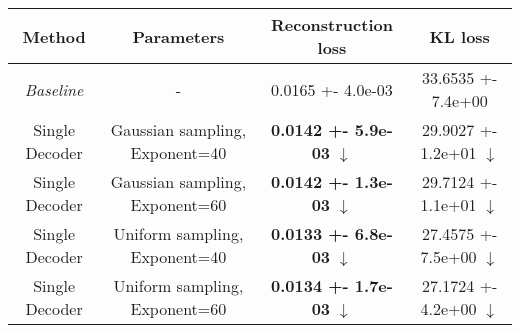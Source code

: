 \centering
\scriptsize
\begin{tabular}{||c|c|c|c||}
\hline
 Method & Parameters & Reconstruction loss & KL loss \\
\hline
\textit{Baseline} & - & 0.0165 +- 4.0e-03 & 33.6535 +- 7.4e+00 \\
\hline
Single Decoder & Gaussian sampling, Exponent=40 & \textbf{0.0142 +- 5.9e-03}  $\downarrow$ & 29.9027 +- 1.2e+01  $\downarrow$ \\
\hline
Single Decoder & Gaussian sampling, Exponent=60 & \textbf{0.0142 +- 1.3e-03}  $\downarrow$ & 29.7124 +- 1.1e+01  $\downarrow$ \\
\hline
Single Decoder & Uniform sampling, Exponent=40 & \textbf{0.0133 +- 6.8e-03}  $\downarrow$ & 27.4575 +- 7.5e+00  $\downarrow$ \\
\hline
Single Decoder & Uniform sampling, Exponent=60 & \textbf{0.0134 +- 1.7e-03}  $\downarrow$ & 27.1724 +- 4.2e+00  $\downarrow$ \\
\hline
\end{tabular}
